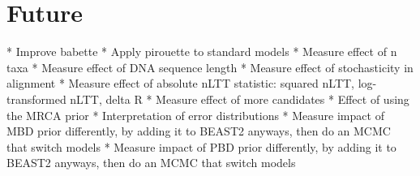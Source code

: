 
\section{Future}

 * Improve babette
 * Apply pirouette to standard models
   * Measure effect of n taxa
   * Measure effect of DNA sequence length
   * Measure effect of stochasticity in alignment
   * Measure effect of absolute nLTT statistic: squared nLTT, 
     log-transformed nLTT, delta R 
   * Measure effect of more candidates
   * Effect of using the MRCA prior
   * Interpretation of error distributions 
 * Measure impact of MBD prior differently, by adding it to BEAST2
   anyways, then do an MCMC that switch models
 * Measure impact of PBD prior differently, by adding it to BEAST2
   anyways, then do an MCMC that switch models




